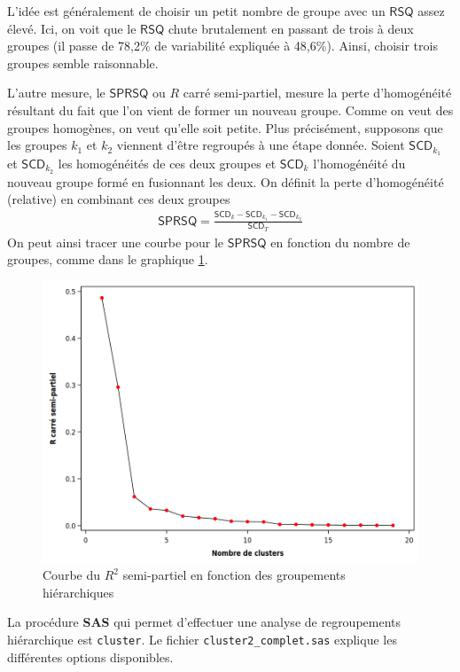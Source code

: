 \documentclass[
  11pt,
  letterpaper,
]{book}
\theoremstyle{definition}
\theoremstyle{definition}
\theoremstyle{definition}
\theoremstyle{remark}
\begin{document}
L'idée est généralement de choisir un petit nombre de groupe avec un \(\mathsf{RSQ}\) assez élevé.
Ici, on voit que le \(\mathsf{RSQ}\) chute brutalement en passant de trois à deux groupes (il passe de 78,2\% de variabilité expliquée à 48,6\%). Ainsi, choisir trois groupes semble raisonnable.

L'autre mesure, le \(\mathsf{SPRSQ}\) ou \(R\) carré semi-partiel, mesure la perte d'homogénéité résultant du fait que l'on vient de former un nouveau groupe. Comme on veut des groupes homogènes, on veut qu'elle soit petite. Plus précisément, supposons que les groupes \(k_1\) et \(k_2\) viennent d'être regroupés à une étape donnée. Soient \(\mathsf{SCD}_{k_1}\) et \(\mathsf{SCD}_{k_2}\) les homogénéités de ces deux groupes et \(\mathsf{SCD}_{k}\) l'homogénéité du nouveau groupe formé en fusionnant les deux.
On définit la perte d'homogénéité (relative) en combinant ces deux groupes
\begin{align*}
\mathsf{SPRSQ} = \frac{\mathsf{SCD}_k - \mathsf{SCD}_{k_1} - \mathsf{SCD}_{k_2}}{\mathsf{SCD}_T}
\end{align*}
On peut ainsi tracer une courbe pour le \(\mathsf{SPRSQ}\) en fonction du nombre de groupes, comme dans le graphique \ref{fig:fig4-e5}.

\begin{figure}

{\centering \includegraphics[width=0.8\linewidth]{figures/04-clustering-e5} 

}

\caption{Courbe du $R^2$ semi-partiel en fonction des groupements hiérarchiques}\label{fig:fig4-e5}
\end{figure}

La procédure \textbf{SAS} qui permet d'effectuer une analyse de regroupements hiérarchique est \texttt{cluster}. Le fichier \texttt{cluster2\_complet.sas} explique les différentes options disponibles.
\end{document}
